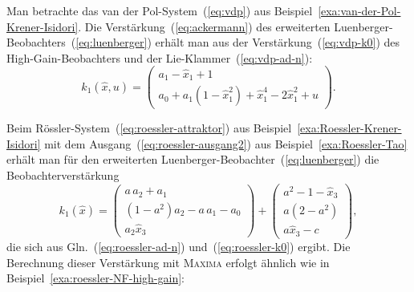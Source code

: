 \medskip{}

\begin{example}
\label{exa:vdp-NF-ELO}Man betrachte das van der Pol-System~(\ref{eq:vdp})
aus Beispiel~\ref{exa:van-der-Pol-Krener-Isidori}. Die Verstärkung~(\ref{eq:ackermann})
des erweiterten Luenberger-Beobachters~(\ref{eq:luenberger}) erhält
man aus der Verstärkung~(\ref{eq:vdp-k0}) des High-Gain-Beobachters
und der Lie-Klammer~(\ref{eq:vdp-ad-n}): 
\begin{equation}
k_{1}(\hat{x},u)=\left(\begin{array}{c}
a_{1}-\hat{x}_{1}+1\\
a_{0}+a_{1}(1-\hat{x}_{1}^{2})+\hat{x}_{1}^{4}-2\hat{x}_{1}^{2}+u
\end{array}\right).\label{eq:k1-vdp}
\end{equation}
\end{example}

\begin{example}
\label{exa:roessler-NF-ELO}Beim Rössler-System~(\ref{eq:roessler-attraktor})
aus Beispiel~\ref{exa:Roessler-Krener-Isidori} mit dem Ausgang~(\ref{eq:roessler-ausgang2})
aus Beispiel~\ref{exa:Roessler-Tao} erhält man für den erweiterten
Luenberger-Beobachter~(\ref{eq:luenberger}) die Beobachterverstärkung
\[
k_{1}(\hat{x})=\left(\begin{array}{c}
a\,a_{2}+a_{1}\\
(1-a^{2})a_{2}-a\,a_{1}-a_{0}\\
a_{2}\hat{x}_{3}
\end{array}\right)+\left(\begin{array}{c}
a^{2}-1-\hat{x}_{3}\\
a(2-a^{2})\\
a\hat{x}_{3}-c
\end{array}\right),
\]
die sich aus Gln.~(\ref{eq:roessler-ad-n}) und~(\ref{eq:roessler-k0})
ergibt. Die Berechnung dieser Verstärkung mit \textsc{Maxima} erfolgt
ähnlich wie in Beispiel~\ref{exa:roessler-NF-high-gain}:

\begin{maxima}\end{maxima}
\end{example}

